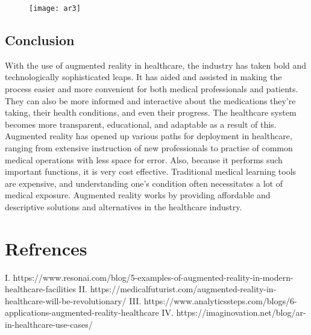 \documentclass[12pt]{article}
\begin{document}
\begin{figure}[h]
\centering
\texttt{[image: ar3]}

\end{figure}

\pagebreak
                                  
\subsection{Conclusion}
 With the use of augmented reality in healthcare, the industry has taken bold and technologically sophisticated leaps. It has aided and assisted in making the process easier and more convenient for both medical professionals and patients. They can also be more informed and interactive about the medications they're taking, their health conditions, and even their progress.
The healthcare system becomes more transparent, educational, and adaptable as a result of this. Augmented reality has opened up various paths for deployment in healthcare, ranging from extensive instruction of new professionals to practise of common medical operations with less space for error.
                                            Also, because it performs such important functions, it is very cost effective. Traditional medical learning tools are expensive, and understanding one's condition often necessitates a lot of medical exposure. Augmented reality works by providing affordable and descriptive solutions and alternatives in the healthcare industry.
                                            
\pagebreak                                            
\section{Refrences}
I.	https://www.resonai.com/blog/5-examples-of-augmented-reality-in-modern-healthcare-facilities
\linebreak
II.	https://medicalfuturist.com/augmented-reality-in-healthcare-will-be-revolutionary/
\linebreak
III.	https://www.analyticssteps.com/blogs/6-applications-augmented-reality-healthcare
\linebreak
IV.	https://imaginovation.net/blog/ar-in-healthcare-use-cases/
\end{document}
